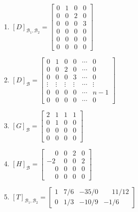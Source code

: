 \documentclass[12pt]{exam}
\begin{document}
\begin{exercicio}
\begin{solucao}
\begin{enumerate}[label={\alph*})]
            \item $[D]_{\mathcal{B}_1, \mathcal{B}_2} = \begin{bmatrix}
                0 & 1 & 0 & 0\\
                0 & 0 & 2 & 0\\
                0 & 0 & 0 & 3\\
                0 & 0 & 0 & 0\\
                0 & 0 & 0 & 0\\
                0 & 0 & 0 & 0
            \end{bmatrix}$

            \item $[D]_\mathcal{B} = \begin{bmatrix}
                0 & 1 & 0 & 0 & \cdots & 0\\
                0 & 0 & 2 & 0 & \cdots & 0\\
                0 & 0 & 0 & 3 & \cdots & 0\\
                \vdots & \vdots & \vdots & \vdots & \cdots & \vdots\\
                0 & 0 & 0 & 0 & \cdots & n - 1\\
                0 & 0 & 0 & 0 & \cdots & 0
            \end{bmatrix}$

            \item $[G]_\mathcal{B} = \begin{bmatrix}
                2 & 1 & 1 & 1\\
                0 & 1 & 0 & 0\\
                0 & 0 & 0 & 0\\
                0 & 0 & 0 & 0
            \end{bmatrix}$

            \item $[H]_\mathcal{B} = \begin{bmatrix}
                \phantom{-}0 & 0 & 2 & 0\\
                -2 & 0 & 0 & 2\\
                \phantom{-}0 & 0 & 0 & 0\\
                \phantom{-}0 & 0 & 0 & 0
            \end{bmatrix}$

            \item $[T]_{\mathcal{B}_1, \mathcal{B}_2} = \begin{bmatrix}
                1 & 7/6 & -35/0 & \phantom{-}11/12\\
                0 & 1/3 & -10/9 & -1/6
            \end{bmatrix}$


\end{enumerate}
\end{solucao}
\end{exercicio}
\end{document}
